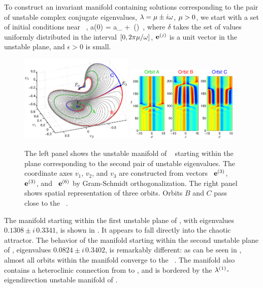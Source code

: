 To construct an invariant manifold containing solutions
corresponding to the pair of unstable complex conjugate eigenvalues,
$\eigExp = \eigRe \pm i\eigIm$,
$\eigRe > 0$, we start with a set of
initial conditions near \eqv\ ,
\beq
  a(0) = a_{{}} + \epsilon\,\exp(\delta)
\,,
where $\delta$ takes the set of values uniformly distributed in the
interval $[0,2\pi\eigRe/\eigIm]$, ${\mathbf e}^{(j)}$ is a unit vector in the
unstable plane, and $\epsilon > 0$ is small.

\begin{figure}[h!t]
\begin{center}
 \includegraphics[width=0.48\textwidth]{../figs/ks22_E1_plane2_manifold_c}
 \includegraphics[width=0.48\textwidth]{../figs/ks22_E1_plane2_orbits_c}
\end{center}
\caption[Unstable manifold of \eqv\ , 2. pair of unstable eigenvalues]{
The left panel shows the unstable
manifold of \eqv\  starting within the plane
corresponding to the second pair of unstable eigenvalues. The
coordinate axes $v_1$, $v_2$, and $v_3$ are constructed from vectors
\Re\, ${\mathbf e}^{(3)}$, \Im\, ${\mathbf e}^{(3)}$, and \Re\, ${\mathbf e}^{(6)}$
by Gram-Schmidt orthogonalization.
The right panel shows spatial representation of three orbits. Orbits
$B$ and $C$ pass close to the \eqv\ .
   }
\label{f:KS22E1man2}
\end{figure}

The manifold starting within the first unstable plane of , with
eigenvalues $0.1308\pm i\,0.3341$, is shown in
. It appears to fall directly into the
chaotic attractor.  The behavior of the manifold starting within
the second unstable plane of , eigenvalues $0.0824\pm i \, 0.3402$, is
remarkably different: as can be seen in ,
almost all orbits within the manifold converge to the \eqv\ .  The
manifold also contains a heteroclinic connection from  to ,
and is bordered by the $\eigExp[1]$-eigendirection
unstable manifold of .

